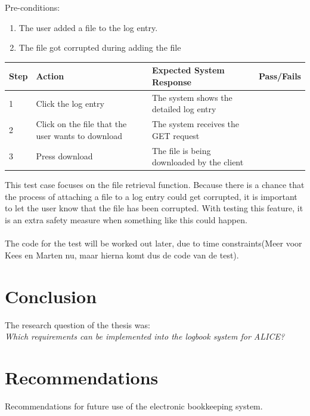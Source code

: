 \documentclass[paper=a4, fontsize=11pt,twoside]{scrartcl}	%
\begin{document}
Pre-conditions: \\
\begin{enumerate}
\item The user added a file to the log entry.
\item The file got corrupted during adding the file
\end{enumerate}

\begin{longtable}{ | p{0.8cm} | p{4.5cm} | p{6cm}  | p{1.5cm} |}
\hline
Step & Action & Expected System Response & Pass/Fails  \\ \hline
1 & Click the log entry & The system shows the detailed log entry &  \\ \hline
2 & Click on the file that the user wants to download & The system receives the GET request &  \\ \hline
3 & Press download & The file is being downloaded by the client &  \\ \hline
\end{longtable}
This test case focuses on the file retrieval function. Because there is a chance that the process of attaching a file to a log entry could get corrupted, it is important to let the user know that the file has been corrupted. With testing this feature, it is an extra safety measure when something like this could happen. \\ \\
The code for the test will be worked out later, due to time constraints(Meer voor Kees en Marten nu, maar hierna komt dus de code van de test).


\newpage
\section{Conclusion}
The research question of the thesis was: \\
\textit{Which requirements can be implemented into the logbook system for ALICE?} \\

\newpage
\section{Recommendations}
Recommendations for future use of the electronic bookkeeping system.
\newpage
\end{document}
